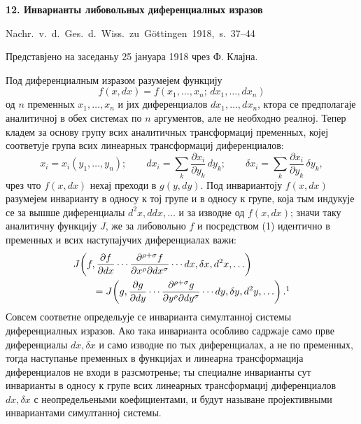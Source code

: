 ﻿\documentclass[11pt]{article}
\begin{document}

\begin{center}
{\Large\bfseries 12. Инварианты либовольных диференциалных изразов}\par
\vspace{1.5em}
\mbox{Nachr. v. d. Ges. d. Wiss. zu Göttingen 1918, s. 37--44}
\end{center}

\vspace{3em}
\begin{center}
Представјено на заседаньу 25 јануара 1918 чрез Ф. Клајна.
\end{center}

Под диференциалным изразом разумејем функцију
\[
f(x,dx)=f(x_1,\ldots,x_n;\,dx_1,\ldots,dx_n)
\]
од \(n\) пременных \(x_1,\ldots,x_n\) и јих диференциалов
\(dx_1,\ldots,dx_n\), ктора се предполагаје аналитичној в обех системах по \(n\) аргументов, але не необходно реалној. Тепер кладем за основу групу всих аналитичных трансформациј пременных, којеј соответује група всих линеарных трансформациј диференциалов:
\begin{equation}
x_i=x_i(y_1,\ldots,y_n);\qquad
dx_i=\sum_k\frac{\partial x_i}{\partial y_k}\,dy_k;\qquad
\delta x_i=\sum_k\frac{\partial x_i}{\partial y_k}\,\delta y_k,
\tag{1}
\end{equation}
чрез что \(f(x,dx)\) нехај преходи в \(g(y,dy)\). Под инвариантоју \(f(x,dx)\) разумејем инварианту в односу к тој групе и в односу к групе, која тым индукује се за вышше диференциалы \(d^2x,ddx,\ldots\) и за изводне од \(f(x,dx)\); значи таку аналитичну функцију \(J\), же за либовольно \(f\) и посредством (1) идентично в пременных и всих наступајучих диференциалах важи:
\[
\begin{aligned}
&J\!\left(f,\frac{\partial f}{\partial dx}\cdots
\frac{\partial^{\rho+\sigma}f}{\partial x^\rho\partial dx^\sigma}
\cdots dx,\delta x,d^2x,\ldots\right)\\
&\qquad =
J\!\left(g,\frac{\partial g}{\partial dy}\cdots
\frac{\partial^{\rho+\sigma}g}{\partial y^\rho\partial dy^\sigma}
\cdots dy,\delta y,d^2y,\ldots\right).\footnotemark
\end{aligned}
\]
Совсем соответне определьује се инварианта симултанној системы диференциалных изразов. Ако така инварианта особливо садржаје само прве диференциалы \(dx,\delta x\) и само изводне по тых диференциалах, а не по пременных, тогда наступанье пременных в функцијах и линеарна трансформација диференциалов не входи в разсмотренье; ты специалне инварианты сут инварианты в односу к групе всих линеарных трансформациј диференциалов \(dx,\delta x\) с неопредельеными коефициентами, и будут называне пројективными инвариантами симултанној системы.
\end{document}
